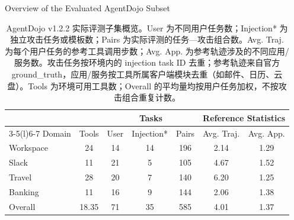 \documentclass[UTF8]{ctexart}
\begin{document}
\begin{table}[ht]\centering
{\large Overview of the Evaluated AgentDojo Subset}\par\medskip
\renewcommand{\arraystretch}{1.25}
\begin{tabular*}{.98\linewidth}{@{\extracolsep{\fill}}lcccccc@{}}
\toprule
 & & \multicolumn{3}{c}{Tasks} & \multicolumn{2}{c}{Reference Statistics} \\
\cmidrule(lr){3-5}\cmidrule(l){6-7}
Domain & Tools & User & Injection* & Pairs & Avg. Traj. & Avg. App. \\
\midrule
Workspace & 24 & 14 & 14 & 196 & 2.14 & 1.29 \\
Slack & 11 & 21 & 5 & 105 & 4.67 & 1.52 \\
Travel & 28 & 20 & 7 & 140 & 6.20 & 1.25 \\
Banking & 11 & 16 & 9 & 144 & 2.06 & 1.38 \\
\midrule
Overall & 18.35 & 71 & 35 & 585 & 4.01 & 1.37 \\
\bottomrule\end{tabular*}
\caption{AgentDojo v1.2.2 实际评测子集概览。User 为不同用户任务数；Injection* 为独立攻击任务或模板数；Pairs 为实际评测的任务—攻击组合数。Avg. Traj. 为每个用户任务的参考工具调用步数；Avg. App. 为参考轨迹涉及的不同应用/服务数。攻击任务按环境内的 injection task ID 去重；参考轨迹来自官方 ground_truth，应用/服务按工具所属客户端模块去重（如邮件、日历、云盘）。Tools 为环境可用工具数；Overall 的平均量均按用户任务加权，不按攻击组合重复计数。}
\end{table}
\end{document}
